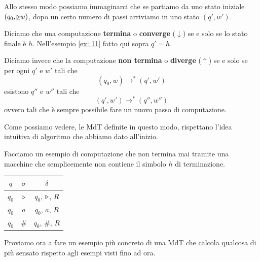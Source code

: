 Allo stesso modo possiamo immaginarci che se partiamo da uno
stato iniziale $(q_0, \underline{\triangleright} w)$, dopo un certo
numero di passi arriviamo in uno stato $(q', w')$.

\begin{definition} \label{def: convergenza}
	Diciamo che una computazione \textbf{termina} o
	\textbf{converge} ($\downarrow$) se e solo se lo stato
	finale è $h$. Nell'esempio \ref{ex: 11} fatto qui sopra
	$q' = h$.

	Diciamo invece che la computazione \textbf{non termina}
	o \textbf{diverge} ($\uparrow$) se e solo se per ogni
	$q'$ e $w'$ tali che
	\[ (q_0, w) \to^* (q', w') \]
	esistono $q''$ e $w''$ tali che
	\[ (q', w') \to^* (q'', w'') \]
	ovvero tali che è sempre possibile fare un nuovo passo di
	computazione.
\end{definition}

Come possiamo vedere, le MdT definite in questo modo,
rispettano l'idea intuitiva di algoritmo che abbiamo dato
all'inizio.

\begin{example} \label{ex: non termina}
	Facciamo un esempio di computazione che non termina mai
	tramite una macchine che semplicemente non contiene il
	simbolo $h$ di terminazione.
	\begin{center}
		\begin{tabular}{|c|c|c|}
			\hline
			$q$   & $\sigma$ & $\delta$             \\
			\hline
			$q_0$ & $\triangleright$ & $q_0$, $\triangleright$, $R$ \\
			$q_0$ & $a$      & $q_0$, $a$, $R$      \\
			$q_0$ & $\#$     & $q_0$, $\#$, $R$     \\
			\hline
		\end{tabular}
	\end{center}
\end{example}

Proviamo ora a fare un esempio più concreto di una MdT che
calcola qualcosa di più sensato rispetto agli esempi visti
fino ad ora.

